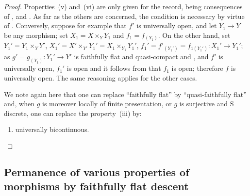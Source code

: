 \begin{proof}
Properties~(v) and~(vi) are only given for the record, being consequences
of ,  and . As far as the others are concerned, the condition is necessary
by virtue of . Conversely, suppose for example that $f'$ is universally
open, and let $Y_1\to Y$ be any morphism; set $X_1=X\times_Y Y_1$ and $f_1=f_{(Y_1)}$.
On the other hand, set $Y_1'=Y_1\times_Y Y'$, $X_1'=X'\times_{Y'}Y_1'=X_1\times_{Y_1}Y_1'$, $f_1'=f'_{(Y_1')}=f_{1(Y_1')}:X_1'\to Y_1'$;
as $g'=g_{(Y_1)}:Y_1'\to Y'$ is faithfully flat and quasi-compact  and ,
and $f'$ is universally open, $f_1'$ is open and it follows from  that $f_1$ is
open; therefore $f$ is universally open. The same reasoning applies for the other cases.

We note again here that one can replace ``faithfully flat'' by ``quasi-faithfully
flat'' and, when $g$ is moreover locally of finite presentation, or $g$
is surjective and $\mathrm{S}$ discrete, one can replace the property~(iii) by:
\begin{enumerate}
  \item[(iii \emph{bis})] universally bicontinuous.
\end{enumerate}
\end{proof}


\subsection{Permanence of various properties of morphisms by faithfully flat descent}
\label{subsection:IV.2.7}


